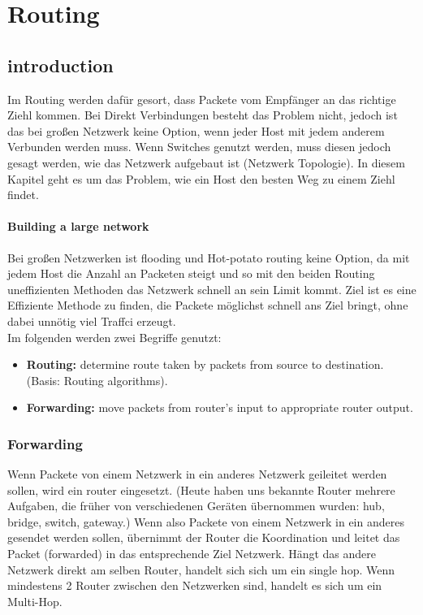 \section{Routing} %
    \subsection{introduction}
        Im Routing werden dafür gesort, dass Packete vom Empfänger an das richtige Ziehl kommen. Bei Direkt Verbindungen besteht das Problem nicht, jedoch ist das bei großen Netzwerk keine Option, wenn jeder Host mit jedem anderem Verbunden werden muss. Wenn Switches genutzt werden, muss diesen jedoch gesagt werden, wie das Netzwerk aufgebaut ist (Netzwerk Topologie). In diesem Kapitel geht es um das Problem, wie ein Host den besten Weg zu einem Ziehl findet. 
        
        \paragraph{Building a large network}
            Bei großen Netzwerken ist flooding und Hot-potato routing keine Option, da mit jedem Host die Anzahl an Packeten steigt und so mit den beiden Routing uneffizienten Methoden das Netzwerk schnell an sein Limit kommt. Ziel ist es eine Effiziente Methode zu finden, die Packete möglichst schnell ans Ziel bringt, ohne dabei unnötig viel Traffci erzeugt. \\
            Im folgenden werden zwei Begriffe genutzt:
            \begin{itemize}
                \item \textbf{Routing:} determine route taken by packets from source to destination. (Basis: Routing algorithms). 
                \item \textbf{Forwarding:} move packets from router's input to appropriate router output. 
            \end{itemize}
            
        \subsubsection{Forwarding}
            Wenn Packete von einem Netzwerk in ein anderes Netzwerk geileitet werden sollen, wird ein router eingesetzt. (Heute haben uns bekannte Router mehrere Aufgaben, die früher von verschiedenen Geräten übernommen wurden: hub, bridge, switch, gateway.) Wenn also Packete von einem Netzwerk in ein anderes gesendet werden sollen, übernimmt der Router die Koordination und leitet das Packet (forwarded) in das entsprechende Ziel Netzwerk. Hängt das andere Netzwerk direkt am selben Router, handelt sich sich um ein single hop. Wenn mindestens 2 Router zwischen den Netzwerken sind, handelt es sich um ein Multi-Hop.
                

